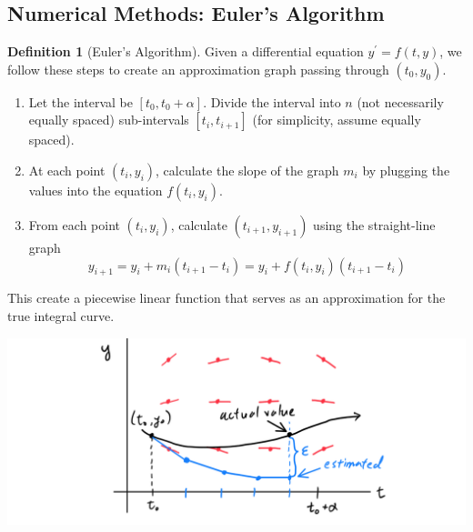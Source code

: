 \documentclass{article}
\theoremstyle{remark}
\theoremstyle{definition}
\newtheorem{definition}{Definition}[section]
\begin{document}
\subsection{Numerical Methods: Euler's Algorithm}
\begin{definition}[Euler's Algorithm]
Given a differential equation $y^\prime = f(t, y)$, we follow these steps to create an approximation graph passing through $(t_0, y_0)$. 
\begin{enumerate}
    \item Let the interval be $[t_0, t_0 + \alpha]$. Divide the interval into $n$ (not necessarily equally spaced) sub-intervals $[t_i, t_{i+1}]$ (for simplicity, assume equally spaced). 
    \item At each point $(t_i, y_i)$, calculate the slope of the graph $m_i$ by plugging the values into the equation $f(t_i, y_i)$. 
    \item From each point $(t_i, y_i)$, calculate $(t_{i+1}, y_{i+1})$ using the straight-line graph 
    \[y_{i+1} = y_i + m_i (t_{i+1} - t_i) = y_i + f(t_i, y_i) (t_{i+1} - t_i)\]
\end{enumerate}
This create a piecewise linear function that serves as an approximation for the true integral curve. 
\begin{center}
    \includegraphics[scale=0.27]{img/Euler_Algorithm.PNG}
\end{center}
\end{definition}
\end{document}
